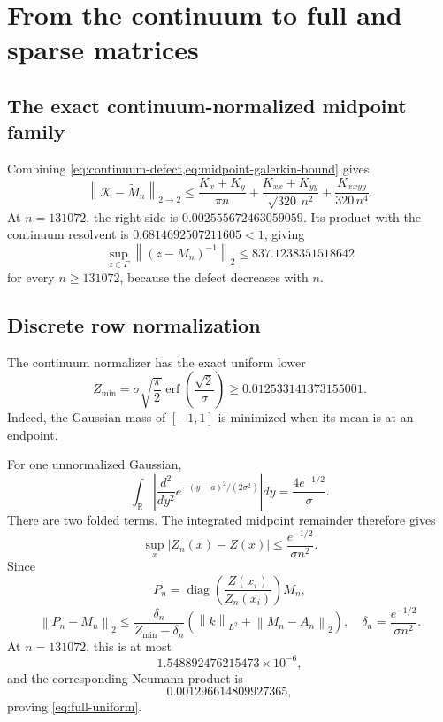\documentclass[11pt]{article}
\theoremstyle{definition}
\theoremstyle{remark}
\newcommand{\R}{\mathbb R}
\newcommand{\cK}{\mathcal K}
\newcommand{\norm}[1]{\left\lVert #1\right\rVert}
\begin{document}
\section{From the continuum to full and sparse matrices}
\label{sec:sparse}

\subsection{The exact continuum-normalized midpoint family}

Combining \cref{eq:continuum-defect,eq:midpoint-galerkin-bound} gives
\[
 \norm{\cK-\widetilde M_n}_{2\to2}
 \le
 \frac{K_x+K_y}{\pi n}
 +\frac{K_{xx}+K_{yy}}{\sqrt{320}\,n^2}
 +\frac{K_{xxyy}}{320\,n^4}.
 \label{eq:continuum-midpoint-family}
\]
At $n=131072$, the right side is
$0.002555672463059059$.  Its product with the continuum resolvent is
$0.6814692507211605<1$, giving
\[
 \sup_{z\in\Gamma}\norm{(z-M_n)^{-1}}_2
 \le837.1238351518642
\]
for every $n\ge131072$, because the defect decreases with $n$.

\subsection{Discrete row normalization}

The continuum normalizer has the exact uniform lower
\begin{equation}
 Z_{\min}
 =
 \sigma\sqrt{\frac\pi2}
 \operatorname{erf}\!\left(\frac{\sqrt2}{\sigma}\right)
 \ge0.012533141373155001.
 \label{eq:normalizer-lower}
\end{equation}
Indeed, the Gaussian mass of $[-1,1]$ is minimized when its mean is at an
endpoint.

For one unnormalized Gaussian,
\[
 \int_\R
 \left|
 \frac{d^2}{dy^2}
 e^{-(y-a)^2/(2\sigma^2)}
 \right|dy
 =
 \frac{4e^{-1/2}}{\sigma}.
\]
There are two folded terms.  The integrated midpoint remainder therefore
gives
\begin{equation}
 \sup_x|Z_n(x)-Z(x)|
 \le\frac{e^{-1/2}}{\sigma n^2}.
 \label{eq:normalizer-error}
\end{equation}
Since
\[
 P_n=\operatorname{diag}\!\left(\frac{Z(x_i)}{Z_n(x_i)}\right)M_n,
\]
\begin{equation}
 \norm{P_n-M_n}_2
 \le
 \frac{\delta_n}{Z_{\min}-\delta_n}
 \left(\norm{k}_{L^2}
       +\norm{M_n-A_n}_2\right),
 \quad
 \delta_n=\frac{e^{-1/2}}{\sigma n^2}.
 \label{eq:normalization-defect}
\end{equation}
At $n=131072$, this is at most
\[
 1.548892476215473\times10^{-6},
\]
and the corresponding Neumann product is
\[
 0.001296614809927365,
\]
proving \eqref{eq:full-uniform}.
\end{document}
